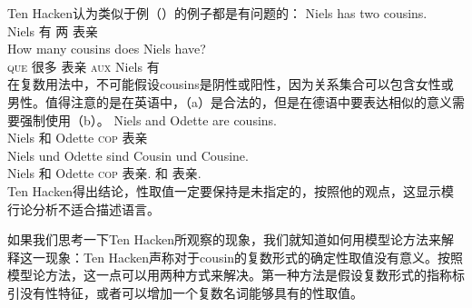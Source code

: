 \noindent
Ten Hacken认为类似于例（）的例子都是有问题的：
\eal
\ex 
\gll Niels has two cousins.\\
	 Niels 有 两 表亲\\
\ex 
\gll How many cousins does Niels have?\\
	\textsc{que} 很多 表亲 \textsc{aux} Niels 有\\
\zl
在复数用法中，不可能假设cousins是阴性或阳性，因为关系集合可以包含女性或男性。值得注意的是在英语中，（a）是合法的，但是在德语中要表达相似的意义需要强制使用（b）。
\eal
\ex 
\gll Niels and Odette are cousins.\\
	Niels 和 Odette \textsc{cop} 表亲\\
\ex 
\gll Niels und Odette sind Cousin und Cousine.\\
	 Niels 和 Odette \textsc{cop} 表亲.\mas{} 和 表亲.\fem\\
\zl
Ten Hacken得出结论，性取值一定要保持是未指定的，按照他的观点，这显示模行论分析不适合描述语言。

如果我们思考一下Ten Hacken所观察的现象，我们就知道如何用模型论方法来解释这一现象：Ten Hacken声称对于cousin的复数形式的确定性取值没有意义。按照模型论方法，这一点可以用两种方式来解决。第一种方法是假设复数形式的指称标引没有性特征，或者可以增加一个复数名词能够具有的性取值。

